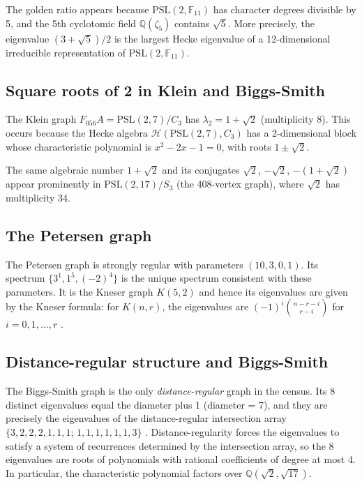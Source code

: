 \documentclass[11pt,a4paper]{amsart}
\theoremstyle{definition}
\theoremstyle{remark}
\newcommand{\PSL}[1]{\mathrm{PSL}(2,\mathbb{F}_{#1})}
\newcommand{\Q}{\mathbb{Q}}
\begin{document}
The golden ratio appears because $\PSL{11}$ has character degrees divisible by
5, and the 5th cyclotomic field $\Q(\zeta_5)$ contains $\sqrt{5}$.  More
precisely, the eigenvalue $(3+\sqrt{5})/2$ is the largest Hecke eigenvalue of
a 12-dimensional irreducible representation of $\PSL{11}$.

\subsection{Square roots of 2 in Klein and Biggs-Smith}

The Klein graph $F_{056}A = \mathrm{PSL}(2,7)/C_3$ has $\lambda_2 = 1+\sqrt{2}$
(multiplicity 8).  This occurs because the Hecke algebra
$\mathcal{H}(\mathrm{PSL}(2,7), C_3)$ has a 2-dimensional block whose
characteristic polynomial is $x^2 - 2x - 1 = 0$, with roots $1\pm\sqrt{2}$.

The same algebraic number $1+\sqrt{2}$ and its conjugates $\sqrt{2}$,
$-\sqrt{2}$, $-(1+\sqrt{2})$ appear prominently in $\mathrm{PSL}(2,17)/S_3$
(the 408-vertex graph), where $\sqrt{2}$ has multiplicity 34.

\subsection{The Petersen graph}

The Petersen graph is strongly regular with parameters $(10,3,0,1)$.  Its
spectrum $\{3^1, 1^5, (-2)^4\}$ is the unique spectrum consistent with these
parameters.  It is the Kneser graph $K(5,2)$ and hence its eigenvalues are
given by the Kneser formula: for $K(n,r)$, the eigenvalues are
$(-1)^i\binom{n-r-i}{r-i}$ for $i=0,1,\ldots,r$ \cite{Biggs1993}.

\subsection{Distance-regular structure and Biggs-Smith}

The Biggs-Smith graph is the only \emph{distance-regular} graph in the census.
Its 8 distinct eigenvalues equal the diameter plus 1 (diameter = 7), and they
are precisely the eigenvalues of the distance-regular intersection array
$\{3,2,2,2,1,1,1;\, 1,1,1,1,1,1,3\}$ \cite{BCN1989}.  Distance-regularity
forces the eigenvalues to satisfy a system of recurrences determined by the
intersection array, so the 8 eigenvalues are roots of polynomials with
rational coefficients of degree at most 4.  In particular, the characteristic
polynomial factors over $\Q(\sqrt{2}, \sqrt{17})$.
\end{document}
